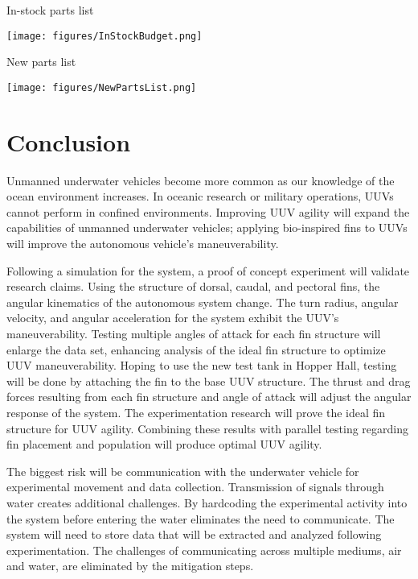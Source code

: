 \documentclass{IEEEtran}
\begin{document}
\begin{table*}[p]
\caption{In-stock parts list}
\label{tab:3}
\begin{center}
\texttt{[image: figures/InStockBudget.png]}
\end{center}
\end{table*}

\begin{table*}[p]
\caption{New parts list}
\label{tab:4}
\begin{center}
\texttt{[image: figures/NewPartsList.png]}
\end{center}
\end{table*}

\section{Conclusion}
Unmanned underwater vehicles become more common as our knowledge of the ocean environment increases.  In oceanic research or military operations, UUVs cannot perform in confined environments.  Improving UUV agility will expand the capabilities of unmanned underwater vehicles; applying bio-inspired fins to UUVs will improve the autonomous vehicle’s maneuverability.  

Following a simulation for the system, a proof of concept experiment will validate research claims.  Using the structure of dorsal, caudal, and pectoral fins, the angular kinematics of the autonomous system change.  The turn radius, angular velocity, and angular acceleration for the system exhibit the UUV’s maneuverability.  Testing multiple angles of attack for each fin structure will enlarge the data set, enhancing analysis of the ideal fin structure to optimize UUV maneuverability.  Hoping to use the new test tank in Hopper Hall, testing will be done by attaching the fin to the base UUV structure.  The thrust and drag forces resulting from each fin structure and angle of attack will adjust the angular response of the system.  The experimentation research will prove the ideal fin structure for UUV agility.  Combining these results with parallel testing regarding fin placement and population will produce optimal UUV agility.   

The biggest risk will be communication with the underwater vehicle for experimental movement and data collection.  Transmission of signals through water creates additional challenges.  By hardcoding the experimental activity into the system before entering the water eliminates the need to communicate.  The system will need to store data that will be extracted and analyzed following experimentation.  The challenges of communicating across multiple mediums, air and water, are eliminated by the mitigation steps.  
\end{document}
